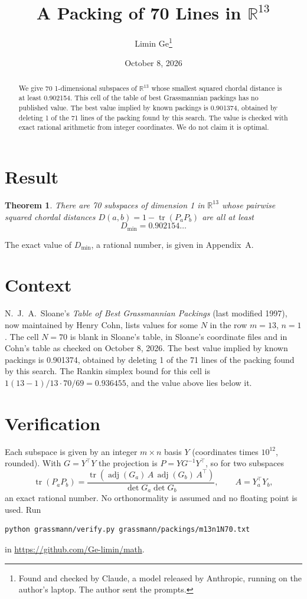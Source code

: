 \documentclass[11pt,a4paper]{article}
\title{A Packing of 70 Lines in $\mathbb{R}^{13}$}
\author{Limin Ge\thanks{Found and checked by Claude, a model released by Anthropic, running on the author's laptop. The author sent the prompts.}}
\date{October 8, 2026}
\newtheorem*{theorem}{Theorem}
\begin{document}
\maketitle
\begin{abstract}
We give 70 1-dimensional subspaces of $\mathbb{R}^{13}$ whose smallest squared chordal distance is at least 0.902154. This cell of the table of best Grassmannian packings has no published value. The best value implied by known packings is 0.901374, obtained by deleting 1 of the 71 lines of the packing found by this search. The value is checked with exact rational arithmetic from integer coordinates. We do not claim it is optimal.
\end{abstract}

\section{Result}
\begin{theorem}
There are 70 subspaces of dimension 1 in $\mathbb{R}^{13}$ whose pairwise squared chordal distances $D(a,b) = 1 - \operatorname{tr}(P_aP_b)$ are all at least
\[ D_{\min} = 0.902154\ldots \]
\end{theorem}
The exact value of $D_{\min}$, a rational number, is given in Appendix~A.


\section{Context}
N.~J.~A.~Sloane's \emph{Table of Best Grassmannian Packings} (last modified 1997), now maintained by Henry Cohn, lists values for some $N$ in the row $m=13$, $n=1$. The cell $N=70$ is blank in Sloane's table, in Sloane's coordinate files and in Cohn's table as checked on October 8, 2026. The best value implied by known packings is 0.901374, obtained by deleting 1 of the 71 lines of the packing found by this search. The Rankin simplex bound for this cell is $1(13-1)/13\cdot 70/69 = 0.936455$, and the value above lies below it.


\section{Verification}
Each subspace is given by an integer $m\times n$ basis $Y$ (coordinates times $10^{12}$, rounded). With $G=Y^\top Y$ the projection is $P=YG^{-1}Y^\top$, so for two subspaces
\[ \operatorname{tr}(P_aP_b)=\frac{\operatorname{tr}(\operatorname{adj}(G_a)\,A\,\operatorname{adj}(G_b)\,A^\top)}{\det G_a\det G_b},\qquad A=Y_a^\top Y_b, \]
an exact rational number. No orthonormality is assumed and no floating point is used. Run
\begin{verbatim}
python grassmann/verify.py grassmann/packings/m13n1N70.txt
\end{verbatim}
in \url{https://github.com/Ge-limin/math}.
\end{document}
